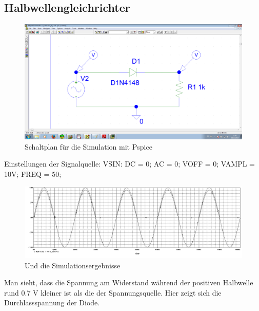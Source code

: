 \subsection{Halbwellengleichrichter}
\begin{figure}[H]
	\centering
	\includegraphics[width=\linewidth]{versuch2/spice/v2_5_1_schematic.png}
	\caption{Schaltplan für die Simulation mit Pspice}
\end{figure}
Einstellungen der Signalquelle: VSIN: DC = 0; AC = 0; VOFF = 0; VAMPL = 10V; FREQ = 50;
\begin{figure}[H]
	\centering
	\includegraphics[width=\linewidth]{versuch2/spice/v2_5_1_simulation.png}
	\caption{Und die Simulationsergebnisse}
\end{figure}
Man sieht, dass die Spannung am Widerstand während der positiven Halbwelle rund 0.7 V kleiner ist als die der Spannungsquelle. Hier zeigt sich die Durchlassspannung der Diode.


